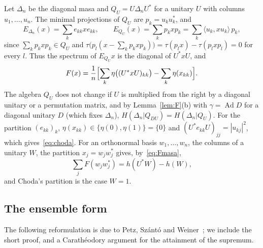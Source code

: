 \documentclass[11pt]{article}
\DeclareMathOperator{\Ad}{Ad}
\theoremstyle{plain}
\theoremstyle{definition}
\theoremstyle{remark}
\begin{document}
Let $\Delta_n$ be the diagonal masa and $Q_U=U\Delta_nU^*$ for a unitary $U$ with columns $u_1,\dots,u_n$. The minimal
projections of $Q_U$ are $p_k=u_ku_k^*$, and
\begin{equation}\label{eq:EQ}
  E_{\Delta_n}(x)=\sum_ke_{kk}xe_{kk},\qquad E_{Q_U}(x)=\sum_kp_kxp_k=\sum_k\langle u_k,xu_k\rangle\,p_k,
\end{equation}
since $\sum_kp_kxp_k\in Q_U$ and $\tau\bigl(p_l(x-\sum_kp_kxp_k)\bigr)=\tau(p_lx)-\tau(p_lxp_l)=0$ for every $l$. Thus the
spectrum of $E_{Q_U}x$ is the diagonal of $U^*xU$, and
\begin{equation}\label{eq:Fmasa}
  F(x)=\frac1n\Bigl[\sum_k\eta\bigl((U^*xU)_{kk}\bigr)-\sum_k\eta(x_{kk})\Bigr].
\end{equation}
The algebra $Q_U$ does not change if $U$ is multiplied from the right by a diagonal unitary or a permutation matrix, and by
Lemma~\ref{lem:F}(b) with $\gamma=\Ad D$ for a diagonal unitary $D$ (which fixes $\Delta_n$), $H(\Delta_n|Q_{DU})=H(\Delta_n|Q_U)$.
For the partition $(e_{kk})_k$, $\eta(x_{kk})\in\{\eta(0),\eta(1)\}=\{0\}$ and $(U^*e_{kk}U)_{jj}=|u_{kj}|^2$, which
gives~\eqref{eq:choda}. For an orthonormal basis $w_1,\dots,w_n$, the columns of a unitary $W$, the partition
$x_j=w_jw_j^*$ gives, by~\eqref{eq:Fmasa},
\begin{equation}\label{eq:basis}
  \sum_jF(w_jw_j^*)=h(U^*W)-h(W),
\end{equation}
and Choda's partition is the case $W=1$.

\subsection{The ensemble form}

The following reformulation is due to Petz, Sz\'ant\'o and Weiner~\cite[Section~3, Lemma~1 and (7), (8)]{petz2009}; we
include the short proof, and a Carath\'eodory argument for the attainment of the supremum.
\end{document}

